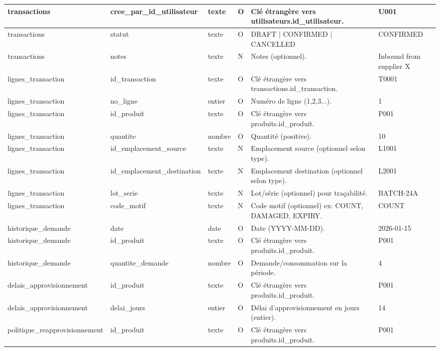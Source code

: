 \documentclass[a4paper,11pt]{article}
\begin{document}
\begin{longtable}{|l|l|l|l|l|l|}
 transactions & cree\_par\_id\_utilisateur & texte & O & Clé étrangère vers utilisateurs.id\_utilisateur. & U001 \\ \hline
\rowcolor{rowgray} transactions & statut & texte & O & DRAFT | CONFIRMED | CANCELLED & CONFIRMED \\ \hline
 transactions & notes & texte & N & Notes (optionnel). & Inbound from supplier X \\ \hline
\rowcolor{rowgray} lignes\_transaction & id\_transaction & texte & O & Clé étrangère vers transactions.id\_transaction. & T0001 \\ \hline
 lignes\_transaction & no\_ligne & entier & O & Numéro de ligne (1,2,3...). & 1 \\ \hline
\rowcolor{rowgray} lignes\_transaction & id\_produit & texte & O & Clé étrangère vers produits.id\_produit. & P001 \\ \hline
 lignes\_transaction & quantite & nombre & O & Quantité (positive). & 10 \\ \hline
\rowcolor{rowgray} lignes\_transaction & id\_emplacement\_source & texte & N & Emplacement source (optionnel selon type). & L1001 \\ \hline
 lignes\_transaction & id\_emplacement\_destination & texte & N & Emplacement destination (optionnel selon type). & L2001 \\ \hline
\rowcolor{rowgray} lignes\_transaction & lot\_serie & texte & N & Lot/série (optionnel) pour traçabilité. & BATCH-24A \\ \hline
 lignes\_transaction & code\_motif & texte & N & Code motif (optionnel) ex: COUNT, DAMAGED, EXPIRY. & COUNT \\ \hline
\rowcolor{rowgray} historique\_demande & date & date & O & Date (YYYY-MM-DD). & 2026-01-15 \\ \hline
 historique\_demande & id\_produit & texte & O & Clé étrangère vers produits.id\_produit. & P001 \\ \hline
\rowcolor{rowgray} historique\_demande & quantite\_demande & nombre & O & Demande/consommation sur la période. & 4 \\ \hline
 delais\_approvisionnement & id\_produit & texte & O & Clé étrangère vers produits.id\_produit. & P001 \\ \hline
\rowcolor{rowgray} delais\_approvisionnement & delai\_jours & entier & O & Délai d'approvisionnement en jours (entier). & 14 \\ \hline
 politique\_reapprovisionnement & id\_produit & texte & O & Clé étrangère vers produits.id\_produit. & P001 \\ \hline

\end{longtable}
\end{document}
